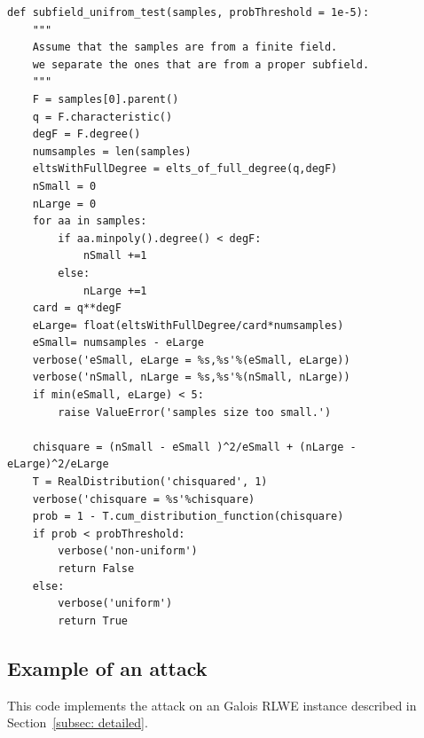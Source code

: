 \documentclass[envcountsame]{llncs}
\begin{document}
\scriptsize
\begin{verbatim}
def subfield_unifrom_test(samples, probThreshold = 1e-5):
    """
    Assume that the samples are from a finite field.
    we separate the ones that are from a proper subfield.
    """
    F = samples[0].parent()
    q = F.characteristic()
    degF = F.degree()
    numsamples = len(samples)
    eltsWithFullDegree = elts_of_full_degree(q,degF)
    nSmall = 0
    nLarge = 0
    for aa in samples:
        if aa.minpoly().degree() < degF:
            nSmall +=1
        else:
            nLarge +=1
    card = q**degF
    eLarge= float(eltsWithFullDegree/card*numsamples)
    eSmall= numsamples - eLarge
    verbose('eSmall, eLarge = %s,%s'%(eSmall, eLarge))
    verbose('nSmall, nLarge = %s,%s'%(nSmall, nLarge))
    if min(eSmall, eLarge) < 5:
        raise ValueError('samples size too small.')

    chisquare = (nSmall - eSmall )^2/eSmall + (nLarge - eLarge)^2/eLarge
    T = RealDistribution('chisquared', 1)
    verbose('chisquare = %s'%chisquare)
    prob = 1 - T.cum_distribution_function(chisquare)
    if prob < probThreshold:
        verbose('non-uniform')
        return False
    else:
        verbose('uniform')
        return True
\end{verbatim}

\subsection{Example of an attack}

\normalsize
This code implements the attack on an Galois RLWE instance described in Section~\ref{subsec: detailed}. 
\end{document}
